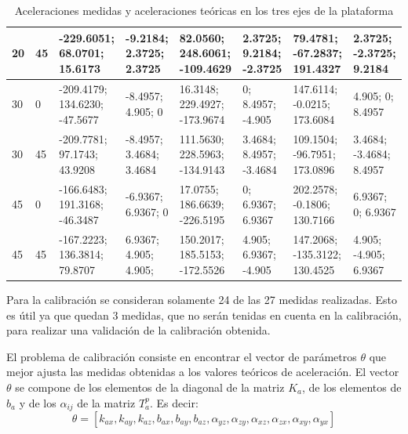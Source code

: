 \documentclass[main]{subfiles}
\begin{document}
\begin{table}[H]
\begin{tiny}
\begin{tabular}{p{30pt}p{30pt}|p{40pt}|p{26pt}|p{40pt}|p{26pt}|p{40pt}|p{26pt}|}
\multicolumn{1}{|p{30pt}|}{20} & 45 &   -229.6051;     68.0701;    15.6173 & -9.2184;    2.3725;    2.3725 & 82.0560;       248.6061;     -109.4629 & 2.3725;    9.2184;    -2.3725 & 79.4781;    -67.2837;     191.4327 & 2.3725;    -2.3725;	9.2184    \\ \hline
\multicolumn{1}{|p{30pt}|}{30} & 0  &  -209.4179;    134.6230;    -47.5677 &       -8.4957;     4.905;    0 & 16.3148;    229.4927;     -173.9674 & 0;		8.4957;		-4.905 & 147.6114;    -0.0215;    173.6084 &  4.905;    0;	8.4957\\ \hline
\multicolumn{1}{|p{30pt}|}{30} & 45 & -209.7781;    97.1743;    43.9208 & -8.4957;    3.4684;    3.4684 & 111.5630;       228.5963;     -134.9143 & 3.4684;    8.4957;	-3.4684 & 109.1504;       -96.7951;     173.0896 & 3.4684;    -3.4684;    8.4957\\ \hline
\multicolumn{1}{|p{30pt}|}{45} & 0  &  -166.6483;    191.3168;    -46.3487 &       -6.9367;    6.9367;    0 & 17.0755;      186.6639;      -226.5195 & 0;          6.9367;    6.9367 & 202.2578;    -0.1806;    130.7166 & 6.9367;    0;         6.9367\\ \hline
\multicolumn{1}{|p{30pt}|}{45} & 45 & -167.2223;    136.3814;    79.8707 &  6.9367;	4.905;     4.905;     & 150.2017;       185.5153;     -172.5526 & 4.905;    6.9367; -4.905      & 147.2068;    -135.3122;     130.4525 &  4.905;    -4.905;	6.9367     \\ \hline


\end{tabular}
\end{tiny}
\caption{Aceleraciones medidas y aceleraciones teóricas en los tres ejes de la plataforma}
\label{tab:acc}
\end{table} 

Para la calibración se consideran solamente 24 de las 27 medidas realizadas. Esto es útil ya que quedan 3 medidas, que no serán tenidas en cuenta en la calibración, para realizar una validaci\'on de la calibración obtenida.

El problema de calibración consiste en encontrar el vector de parámetros $\theta$ que mejor ajusta las medidas obtenidas a los valores teóricos de aceleración. El vector $\theta$ se compone de los elementos de la diagonal de la matriz $K_a$, de los elementos de $b_a$ y de los $\alpha_{ij}$ de la matriz $T_a^p$. Es decir: 
\begin{equation}
\theta =\left[ k_{ax} , k_{ay} , k_{az} ,b_{ax} ,b_{ay} ,b_{az}, \alpha_{yz} , \alpha_{zy} , \alpha_{xz} , \alpha_{zx} , \alpha_{xy} , \alpha_{yx} \right]\end{equation}
\end{document}
